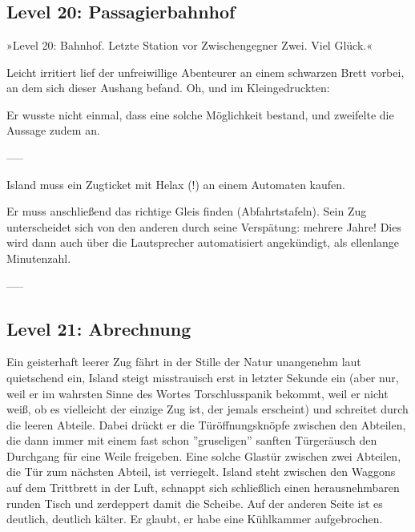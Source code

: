 \chapter{}


\section{Level 20: Passagierbahnhof}

»Level 20: Bahnhof. Letzte Station vor Zwischengegner Zwei. Viel Glück.«

Leicht irritiert lief der unfreiwillige Abenteurer an einem schwarzen Brett vorbei, an dem sich dieser Aushang befand. Oh, und im Kleingedruckten:


Er wusste nicht einmal, dass eine solche Möglichkeit bestand, und zweifelte die Aussage zudem an.

-----

Island muss ein Zugticket mit Helax (!) an einem Automaten kaufen.

Er muss anschließend das richtige Gleis finden (Abfahrtstafeln). Sein Zug unterscheidet sich von den anderen durch seine Verspätung: mehrere Jahre! Dies wird dann auch über die Lautsprecher automatisiert angekündigt, als ellenlange Minutenzahl.

-----

\section{Level 21: Abrechnung}

Ein geisterhaft leerer Zug fährt in der Stille der Natur unangenehm laut quietschend ein, Island steigt misstrauisch erst in letzter Sekunde ein (aber nur, weil er im wahrsten Sinne des Wortes Torschlusspanik bekommt, weil er nicht weiß, ob es vielleicht der einzige Zug ist, der jemals erscheint) und schreitet durch die leeren Abteile. Dabei drückt er die Türöffnungsknöpfe zwischen den Abteilen, die dann immer mit einem fast schon ''gruseligen'' sanften Türgeräusch den Durchgang für eine Weile freigeben. Eine solche Glastür zwischen zwei Abteilen, die Tür zum nächsten Abteil, ist verriegelt. Island steht zwischen den Waggons auf dem Trittbrett in der Luft, schnappt sich schließlich einen herausnehmbaren runden Tisch und zerdeppert damit die Scheibe. Auf der anderen Seite ist es deutlich, deutlich kälter. Er glaubt, er habe eine Kühlkammer aufgebrochen.

